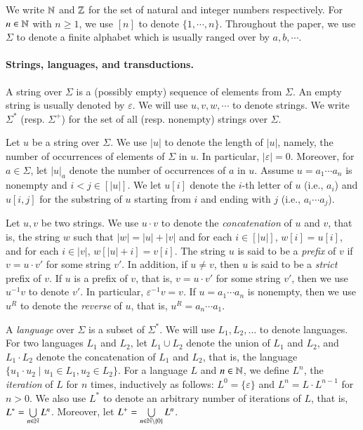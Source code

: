 
We write $\mathbb{N}$ and $\mathbb{Z}$ for the set of natural and integer numbers respectively. For $n \in \mathbb{N}$ with $n \ge 1$, we use $[n]$ to denote $\{1, \cdots, n\}$. Throughout the paper, we use $\Sigma$ to denote a finite alphabet which is usually ranged over by $a,b,\cdots$.

\paragraph*{Strings, languages, and transductions.}
A string over $\Sigma$ is a (possibly empty) sequence of elements from $\Sigma$. An empty string is usually denoted by $\varepsilon$. We will use $u, v, w, \cdots$ to denote strings. We write $\Sigma^*$ (resp. $\Sigma^+$) for the set of all (resp. nonempty) strings over $\Sigma$.

Let $u$ be a string over $\Sigma$. We use $|u|$ to denote the length of $|u|$, namely, the number of occurrences of elements of $\Sigma$ in $u$. In particular, $|\varepsilon|=0$. Moreover, for $a \in \Sigma$, let $|u|_a$ denote the number of occurrences of $a$ in $u$. 
Assume $u=a_1\cdots a_n$ is nonempty and $i<j\in [|u|]$. %
We let $u[i]$ denote the $i$-th letter of $u$ (i.e., $a_i$) and $u[i,j]$ for the substring of $u$ starting from $i$ and ending with $j$ (i.e., $a_i\cdots a_j$). 

Let $u, v$ be two strings. We use $u \cdot v$ to denote the \emph{concatenation} of $u$ and $v$, that is, the string $w$ such that $|w|= |u| + |v|$ and for each $i \in [|u|]$, $w[i]= u[i]$, and for each $i \in |v|$, $w[|u|+i]=v[i]$. The string $u$ is said to be a \emph{prefix} of $v$ if $v = u \cdot v'$ for some string $v'$.
In addition, if $u \neq v$, then $u$ is said to be a \emph{strict} prefix of $v$. If $u$ is a prefix of $v$, that is, $v = u \cdot v'$ for some string $v'$, then 
we use $u^{-1} v$ to denote $v'$. In particular, $\varepsilon^{-1} v = v$.
If $u=a_1 \cdots a_n$ is nonempty, then we use $u^R$ to denote the \emph{reverse} of $u$, that is, $u^R= a_n \cdots a_1$. 


A \emph{language} over $\Sigma$ is a subset of $\Sigma^*$.  
We will use $L_1, L_2, \dots$ to denote languages. For two languages $L_1$ and $L_2$, let $L_1 \cup L_2$ denote the union of $L_1$ and $L_2$, and $L_1 \cdot L_2$ denote the concatenation of $L_1$ and $L_2$, that is, the language $\{u_1 \cdot u_2 \mid u_1 \in L_1, u_2 \in L_2\}$. 
For a language $L$ and $n \in \mathbb{N}$, we define $L^n$, the \emph{iteration} of $L$ for $n$ times, inductively as follows: $L^0=\{\varepsilon\}$ and $L^{n} =L \cdot L^{n-1}$ for $n > 0$. We also use $L^*$ to denote an arbitrary number of iterations of $L$, that is, $L^* = \bigcup \limits_{n \in \mathbb{N}} L^n$. Moreover, let $L^+ = \bigcup \limits_{n \in \mathbb{N} \setminus \{0\}} L^n$. 

